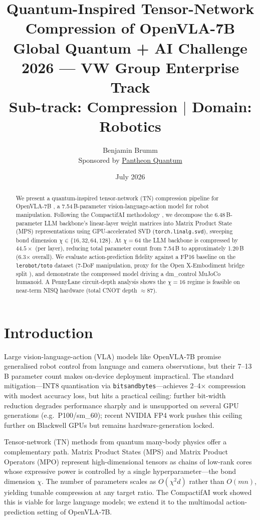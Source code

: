 \documentclass[10pt,twocolumn]{article}
\title{\textbf{Quantum-Inspired Tensor-Network Compression of OpenVLA-7B}\\[4pt]
  \large Global Quantum + AI Challenge 2026 --- VW Group Enterprise Track\\
  Sub-track: Compression $|$ Domain: Robotics}
\author{Benjamin Brumm\\[4pt]
  \small Sponsored by \href{https://pantheonquantum.com}{Pantheon Quantum}}
\date{July 2026}
\begin{document}
\maketitle

\begin{abstract}
We present a quantum-inspired tensor-network (TN) compression pipeline for
OpenVLA-7B \cite{kim2024openvla}, a 7.54\,B-parameter vision-language-action model
for robot manipulation. Following the CompactifAI methodology \cite{tomut2024compactifai},
we decompose the 6.48\,B-parameter LLM backbone's linear-layer weight matrices into
Matrix Product State (MPS) representations using GPU-accelerated SVD
(\texttt{torch.linalg.svd}), sweeping bond dimension $\chi \in \{16,32,64,128\}$.
At $\chi=64$ the LLM backbone is compressed by $44.5\times$ (per layer), reducing
total parameter count from 7.54\,B to approximately 1.20\,B (6.3$\times$ overall).
We evaluate action-prediction fidelity against a FP16 baseline on the
\texttt{lerobot/toto} dataset (7-DoF manipulation, proxy for the Open X-Embodiment
bridge split \cite{open_x_embodiment_2023}), and demonstrate the compressed model
driving a dm\_control MuJoCo humanoid. A PennyLane circuit-depth analysis shows the
$\chi=16$ regime is feasible on near-term NISQ hardware (total CNOT depth $\approx87$).
\end{abstract}

\section{Introduction}

Large vision-language-action (VLA) models like OpenVLA-7B promise generalised robot
control from language and camera observations, but their 7--13\,B parameter count
makes on-device deployment impractical. The standard mitigation---INT8 quantisation
via \texttt{bitsandbytes}---achieves 2--4$\times$ compression with modest accuracy
loss, but hits a practical ceiling: further bit-width reduction degrades performance
sharply and is unsupported on several GPU generations (e.g.\ P100/sm\_60); recent
NVIDIA FP4 work \cite{nvfp4} pushes this ceiling further on Blackwell GPUs but
remains hardware-generation locked.

Tensor-network (TN) methods from quantum many-body physics offer a complementary
path. Matrix Product States (MPS) and Matrix Product Operators (MPO) represent
high-dimensional tensors as chains of low-rank cores whose expressive power is
controlled by a single hyperparameter---the bond dimension $\chi$. The number of
parameters scales as $O(\chi^2 d)$ rather than $O(mn)$, yielding tunable
compression at any target ratio. The CompactifAI work \cite{tomut2024compactifai}
showed this is viable for large language models; we extend it to the multimodal
action-prediction setting of OpenVLA-7B.
\end{document}
